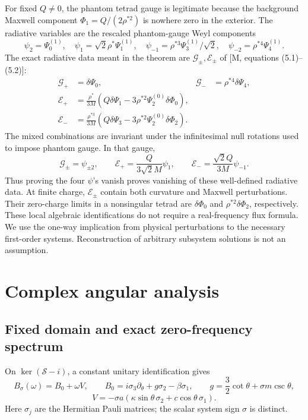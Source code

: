 \documentclass[
  10pt,
  a4paper,
]{article}
\begin{document}
For fixed \(Q\ne0\), the phantom tetrad gauge is legitimate because the
background Maxwell component \(\Phi_1=Q/(2\rho^{*2})\) is nowhere zero
in the exterior. The radiative variables are the rescaled phantom-gauge
Weyl components \[
 \psi_2=\Psi_0^{(1)},\quad
 \psi_1=\sqrt2\rho^*\Psi_1^{(1)},\quad
 \psi_{-1}=\rho^{*3}\Psi_3^{(1)}/\sqrt2,\quad
 \psi_{-2}=\rho^{*4}\Psi_4^{(1)}.
 \tag{8}
\] The exact radiative data meant in the theorem are
\(\mathcal G_\pm,\mathcal E_\pm\) of {[}M, equations (5.1)--(5.2){]}: \[
\begin{aligned}
 \mathcal G_+&=\delta\Psi_0,&
 \mathcal G_-&=\rho^{*4}\delta\Psi_4,\\
 \mathcal E_+&=\frac{\rho^*}{3M}
     (Q\delta\Psi_1-3\rho^{*2}\Psi_2^{(0)}\delta\Phi_0),\\
 \mathcal E_-&=\frac{\rho^{*3}}{3M}
     (Q\delta\Psi_3-3\rho^{*2}\Psi_2^{(0)}\delta\Phi_2).
\end{aligned}
 \tag{8a}
\] The mixed combinations are invariant under the infinitesimal null
rotations used to impose phantom gauge. In that gauge, \[
 \mathcal G_\pm=\psi_{\pm2},\qquad
 \mathcal E_+=\frac{Q}{3\sqrt2M}\psi_1,\qquad
 \mathcal E_-=\frac{\sqrt2Q}{3M}\psi_{-1}.
 \tag{8b}
\] Thus proving the four \(\psi\)'s vanish proves vanishing of these
well-defined radiative data. At finite charge, \(\mathcal E_\pm\)
contain both curvature and Maxwell perturbations. Their zero-charge
limits in a nonsingular tetrad are \(\delta\Phi_0\) and
\(\rho^{*2}\delta\Phi_2\), respectively. These local algebraic
identifications do not require a real-frequency flux formula. We use the
one-way implication from physical perturbations to the necessary
first-order systems. Reconstruction of arbitrary subsystem solutions is
not an assumption.

\section{Complex angular analysis}\label{complex-angular-analysis}

\subsection{Fixed domain and exact zero-frequency
spectrum}\label{fixed-domain-and-exact-zero-frequency-spectrum}

On \(\ker(\mathcal S-i)\), a constant unitary identification gives \[
 B_\sigma(\omega)=B_0+\omega V,\qquad
 B_0=i\sigma_3\partial_\theta+g\sigma_2-\beta\sigma_1,\qquad
 g=\frac32\cot\theta+\sigma m\csc\theta,
 \tag{9}
\] \[
 V=-\sigma a(\kappa\sin\theta\,\sigma_2+c\cos\theta\,\sigma_1).
\] Here \(\sigma_j\) are the Hermitian Pauli matrices; the scalar system
sign \(\sigma\) is distinct.
\end{document}
